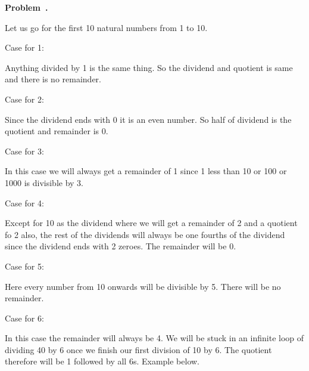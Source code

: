 \documentclass[10pt]{article}
\newcounter{problem}
\newenvironment{problem}[1][]{
  \refstepcounter{problem}
  \par\noindent\textbf{Problem~\theproblem. #1}\par
  \vspace{0.5em}
}{\vspace{1em}}
\begin{document}
\begin{problem} %
Let us go for the first 10 natural numbers from 1 to 10.

Case for 1:

Anything divided by 1 is the same thing. So the dividend and quotient is same and there is no remainder.

\begin{center}
\end{center}

Case for 2:

Since the dividend ends with 0 it is an even number. So half of dividend is the quotient and remainder is 0.

\begin{center}
\end{center}

Case for 3:

In this case we will always get a remainder of 1 since 1 less than 10 or 100 or 1000 is divisible by 3.

\begin{center}
\end{center}

Case for 4:

Except for 10 as the dividend where we will get a remainder of 2 and a quotient fo 2 also, the rest of
the dividends will always be one fourths of the dividend since the dividend ends with 2 zeroes. The
remainder will be 0.

\begin{center}
\end{center}

Case for 5:

Here every number from 10 onwards will be divisible by 5. There will be no remainder.

\begin{center}
\end{center}

Case for 6:

In this case the remainder will always be 4. We will be stuck in an infinite loop of dividing 40 by 6 once we
finish our first division of 10 by 6. The quotient therefore will be 1 followed by all 6s. Example below.

\begin{center}
\end{center}


\end{problem}
\end{document}
